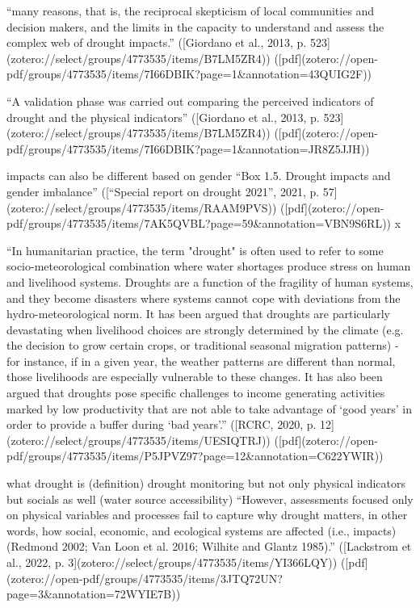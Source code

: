 {“many reasons, that is, the reciprocal skepticism of local communities and decision makers, and the limits in the capacity to understand and assess the complex web of drought impacts.” ([Giordano et al., 2013, p. 523](zotero://select/groups/4773535/items/B7LM5ZR4)) ([pdf](zotero://open-pdf/groups/4773535/items/7I66DBIK?page=1&annotation=43QUIG2F))

“A validation phase was carried out comparing the perceived indicators of drought and the physical indicators” ([Giordano et al., 2013, p. 523](zotero://select/groups/4773535/items/B7LM5ZR4)) ([pdf](zotero://open-pdf/groups/4773535/items/7I66DBIK?page=1&annotation=JR8Z5JJH))

impacts can also be different based on gender “Box 1.5. Drought impacts and gender imbalance” ([“Special report on drought 2021”, 2021, p. 57](zotero://select/groups/4773535/items/RAAM9PVS)) ([pdf](zotero://open-pdf/groups/4773535/items/7AK5QVBL?page=59&annotation=VBN9S6RL)) x

“In humanitarian practice, the term "drought" is often used to refer to some socio-meteorological combination where water shortages produce stress on human and livelihood systems. Droughts are a function of the fragility of human systems, and they become disasters where systems cannot cope with deviations from the hydro-meteorological norm. It has been argued that droughts are particularly devastating when livelihood choices are strongly determined by the climate (e.g. the decision to grow certain crops, or traditional seasonal migration patterns) - for instance, if in a given year, the weather patterns are different than normal, those livelihoods are especially vulnerable to these changes. It has also been argued that droughts pose specific challenges to income generating activities marked by low productivity that are not able to take advantage of ‘good years’ in order to provide a buffer during ‘bad years’.” ([RCRC, 2020, p. 12](zotero://select/groups/4773535/items/UESIQTRJ)) ([pdf](zotero://open-pdf/groups/4773535/items/P5JPVZ97?page=12&annotation=C622YWIR))

what drought is (definition)
drought monitoring but not only physical indicators but socials as well (water source accessibility) “However, assessments focused only on physical variables and processes fail to capture why drought matters, in other words, how social, economic, and ecological systems are affected (i.e., impacts) (Redmond 2002; Van Loon et al. 2016; Wilhite and Glantz 1985).” ([Lackstrom et al., 2022, p. 3](zotero://select/groups/4773535/items/YI366LQY)) ([pdf](zotero://open-pdf/groups/4773535/items/3JTQ72UN?page=3\&annotation=72WYIE7B))



}
